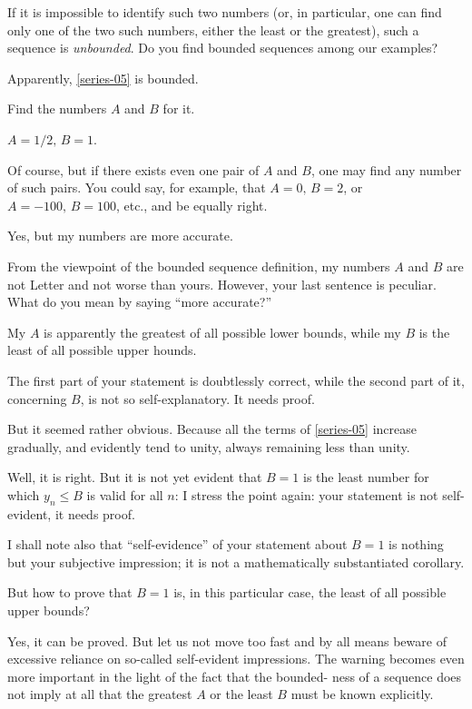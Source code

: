 {If it is impossible to identify such two numbers (or, in particular, one can find only one of the two such numbers, either the least or the greatest), such a sequence is \emph{unbounded}. Do you find bounded sequences among our examples? 

\rdr Apparently, \eqref{series-05} is bounded. 

\athr Find the numbers $A$ and $B$ for it.

\rdr $A=1/2, \, B= 1$.

\athr Of course, but if there exists even one pair of $A$ and $B$, one may find any number of such pairs. You could say, for example, that $A= 0, \, B= 2$, or $A=-100, \, B = 100$, etc., and be equally right.

\rdr Yes, but my numbers are more accurate.

\athr From the viewpoint of the bounded sequence definition, my numbers $A$ and $B$ are not Letter and not worse than yours. However, your last sentence is peculiar. What do you mean by saying ``more accurate?''

\rdr My $A$ is apparently the greatest of all possible lower bounds, while my $B$ is the least of all possible upper hounds.

\athr The first part of your statement is doubtlessly correct, while the second part of it, concerning $B$, is not so self-explanatory. It needs proof.

\rdr But it seemed	rather obvious. Because all the terms of \eqref{series-05} increase gradually, and evidently tend to unity, always remaining less than unity.

\athr Well, it is right. But it is not yet evident that $B = 1$ is the least number for which $y_{n} \leqslant B$ is valid for all $n$: I stress the point again: your statement is not self-evident, it needs proof.

I shall note also that ``self-evidence'' of your statement about $B = 1$ is nothing but your subjective impression; it is not a mathematically substantiated corollary.


\rdr But how to prove that $B = 1$ is, in this particular case, the least of all possible upper bounds?

\athr Yes, it can be proved. But let us not move too fast and by all means beware of excessive reliance on so-called self-evident impressions. The warning becomes even more important in the light of the fact that the bounded- ness of a sequence does not imply at all that the greatest $A$ or the least $B$ must be known explicitly.

}
